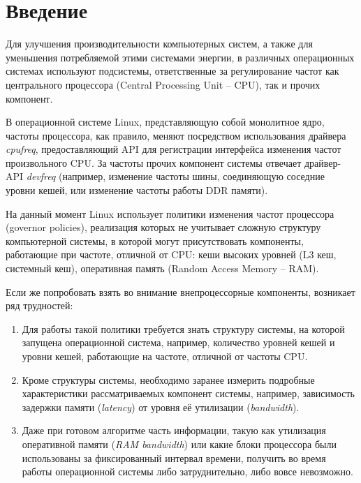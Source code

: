 \section{Введение}
\label{sec:Section0} 

    Для улучшения производительности компьютерных систем, а также для уменьшения потребляемой
    этими системами энергии, в различных операционных системах используют подсистемы,
    ответственные за регулирование частот как центрального процессора (Central Processing Unit -- CPU),
    так и прочих компонент.

    В операционной системе Linux, представляющую собой монолитное ядро, частоты процессора,
    как правило, меняют посредством использования драйвера \textit{cpufreq}, предоставляющий
    API для регистрации интерфейса изменения частот произвольного CPU. За частоты прочих компонент
    системы отвечает драйвер-API \textit{devfreq} (например, изменение частоты шины, соединяющую
    соседние уровни кешей, или изменение частоты работы DDR памяти).

    На данный момент Linux использует политики изменения частот процессора (governor policies),
    реализация которых не учитывает сложную структуру компьютерной системы, в которой могут
    присутствовать компоненты, работающие при частоте, отличной от CPU: кеши высоких уровней
    (L3 кеш, системный кеш), оперативная память (Random Access Memory -- RAM).

    Если же попробовать взять во внимание внепроцессорные компоненты, возникает ряд трудностей:
    \begin{enumerate}
        \item Для работы такой политики требуется знать структуру системы, на которой
        запущена операционной система, например, количество уровней кешей и уровни кешей, работающие
        на частоте, отличной от частоты CPU.
        \item Кроме структуры системы, необходимо заранее измерить подробные характеристики
        рассматриваемых компонент системы, например, зависимость задержки памяти (\textit{latency})
        от уровня её утилизации (\textit{bandwidth}).
        \item Даже при готовом алгоритме часть информации, такую как утилизация оперативной памяти
        (\textit{RAM bandwidth}) или какие блоки процессора были использованы за фиксированный
        интервал времени, получить во время работы операционной системы либо затруднительно,
        либо вовсе невозможно.
    \end{enumerate}

